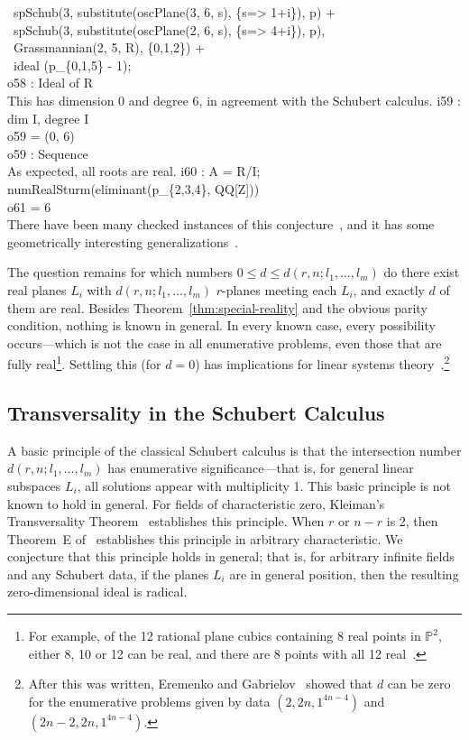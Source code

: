 \            spSchub(3, substitute(oscPlane(3, 6, s), \{s=> 1+i\}), p) +\\
\            spSchub(3, substitute(oscPlane(2, 6, s), \{s=> 4+i\}), p), \\
\            Grassmannian(2, 5, R), \{0,1,2\}) + \\
\           ideal (p_\{0,1,5\} - 1);\\
\emptyLine
o58 : Ideal of R\\
\endOutput
%
This has dimension 0 and degree 6, in agreement with the Schubert calculus.
%
\beginOutput
i59 : dim I, degree I\\
\emptyLine
o59 = (0, 6)\\
\emptyLine
o59 : Sequence\\
\endOutput
%
As expected, all roots are real.
%
\beginOutput
i60 : A = R/I; numRealSturm(eliminant(p_\{2,3,4\}, QQ[Z]))\\
\emptyLine
o61 = 6\\
\endOutput
%
There have been many checked instances of this
conjecture~\cite{SO:So_shap-www,SO:So00b,SO:Ver00}, and it has some
geometrically interesting generalizations~\cite{SO:So_flags}.

The question remains for which numbers $0\leq d\leq d(r,n;l_1,\ldots,l_m)$ do
there exist real planes $L_i$ with $d(r,n;l_1,\ldots,l_m)$
$r$-planes meeting each $L_i$, and exactly $d$ of them are real.
Besides Theorem~\ref{thm:special-reality} and the obvious parity condition,
nothing is known in general.
In every known case, every possibility occurs---which is not the case in all
enumerative problems, even those that are fully real\footnote{For example, of
the 12 rational plane cubics containing 8 real points in ${\mathbb P}^2$,
either 8, 10 or 12 can be real, and there are 8 points with all 12
real~\cite[Proposition 4.7.3]{SO:DeKh00}.}.
Settling this (for $d=0$) has implications for linear systems
theory~\cite{SO:RS98}.\footnote{After this was written, Eremenko and
Gabrielov~\cite{SO:EG-NR} showed that $d$ can be zero for the enumerative 
problems given by data $(2,2n,1^{4n-4})$ and  $(2n-2,2n,1^{4n-4})$.}

\subsection{Transversality in the Schubert Calculus}
A basic principle of the classical Schubert calculus
is that the intersection 
number $d(r,n;l_1,\ldots,l_m)$ has enumerative significance---that is, for
general linear subspaces $L_i$, all solutions appear with multiplicity 1.
This basic principle is not known to hold in general.
For fields of characteristic zero, Kleiman's Transversality
Theorem~\cite{SO:MR50:13063} establishes this principle.
When $r$ or $n{-}r$ is 2, then Theorem~E of~\cite{SO:So97a} establishes this
principle in arbitrary characteristic.
We conjecture that this principle holds in general; that is, for arbitrary
infinite fields and any Schubert data, if the planes $L_i$ are in general
position, then the resulting zero-dimensional ideal is
radical. 

